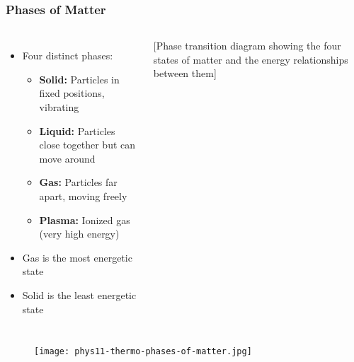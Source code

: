 \documentclass{beamer}
\begin{document}
\begin{frame}
    \frametitle{Phases of Matter}
    \begin{columns}
        \begin{itemize}
            \item Four distinct phases:
            \begin{itemize}
                \item \textbf{Solid:} Particles in fixed positions, vibrating
                \item \textbf{Liquid:} Particles close together but can move around
                \item \textbf{Gas:} Particles far apart, moving freely
                \item \textbf{Plasma:} Ionized gas (very high energy)
            \end{itemize}
            \item Gas is the most energetic state
            \item Solid is the least energetic state
        \end{itemize}
        
        \begin{center}
            \alert{[Phase transition diagram showing the four states of matter and the energy relationships between them]}
        \end{center}
    \end{columns}
\end{frame}

\begin{frame}
\begin{figure}
    \centering
    \texttt{[image: phys11-thermo-phases-of-matter.jpg]}
\end{figure}
\end{frame}
\end{document}

